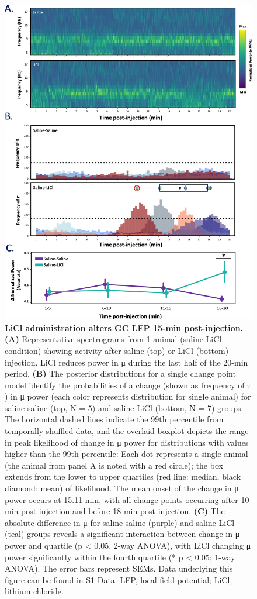 \begin{refsection}
{\begin{figure}
\centering
\includegraphics[width=0.7\linewidth]{stone_2022_figs/journal.pbio.3001537.g002.png}
\caption{\textbf{LiCl administration alters GC LFP 15-min post-injection.} \textbf{(A)} Representative spectrograms from 1 animal (saline-LiCl condition) showing activity after saline (top) or LiCl (bottom) injection. LiCl reduces power in μ during the last half of the 20-min period. \textbf{(B)} The posterior distributions for a single change point model identify the probabilities of a change (shown as frequency of \(\tau\)) in μ power (each color represents distribution for single animal) for saline-saline (top, N = 5) and saline-LiCl (bottom, N = 7) groups. The horizontal dashed lines indicate the 99th percentile from temporally shuffled data, and the overlaid boxplot depicts the range in peak likelihood of change in μ power for distributions with values higher than the 99th percentile: Each dot represents a single animal (the animal from panel A is noted with a red circle); the box extends from the lower to upper quartiles (red line: median, black diamond: mean) of likelihood. The mean onset of the change in μ power occurs at 15.11 min, with all change points occurring after 10-min post-injection and before 18-min post-injection. \textbf{(C)} The absolute difference in μ for saline-saline (purple) and saline-LiCl (teal) groups reveals a significant interaction between change in μ power and quartile (p < 0.05, 2-way ANOVA), with LiCl changing μ power significantly within the fourth quartile (* p < 0.05; 1-way ANOVA). The error bars represent SEMs. Data underlying this figure can be found in S1 Data. LFP, local field potential; LiCl, lithium chloride.
}
\label{fig:wrapfig}
\end{figure}

}
\end{refsection}

